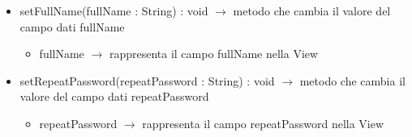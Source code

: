 \begin{description}
\begin{itemize}
	\item setFullName(fullName : String) : void $\rightarrow$ metodo che cambia il valore del campo dati fullName\begin{itemize}
		\item fullName $\rightarrow$ rappresenta il campo fullName nella View
	\end{itemize}
	
	\item setRepeatPassword(repeatPassword : String) : void $\rightarrow$ metodo che cambia il valore del campo dati repeatPassword\begin{itemize}
		\item repeatPassword $\rightarrow$ rappresenta il campo repeatPassword nella View
	\end{itemize}
	
\end{itemize}

\end{description}

